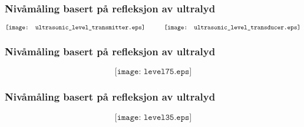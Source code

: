 \documentclass[aspectratio=169,xcolor=dvipsnames]{beamer}
\begin{document}
%
\begin{frame}
	\frametitle{Nivåmåling basert på refleksjon av ultralyd}

$$\texttt{[image: ultrasonic\_level\_transmitter.eps]} \hskip 30pt \texttt{[image: ultrasonic\_level\_transducer.eps]}$$
\end{frame}
%
%
%
%
\begin{frame}
	\frametitle{Nivåmåling basert på refleksjon av ultralyd}

$$\texttt{[image: level75.eps]}$$
\end{frame}
%
%
%
%
\begin{frame}
	\frametitle{Nivåmåling basert på refleksjon av ultralyd}

$$\texttt{[image: level35.eps]}$$
\end{frame}
%
\end{document}
